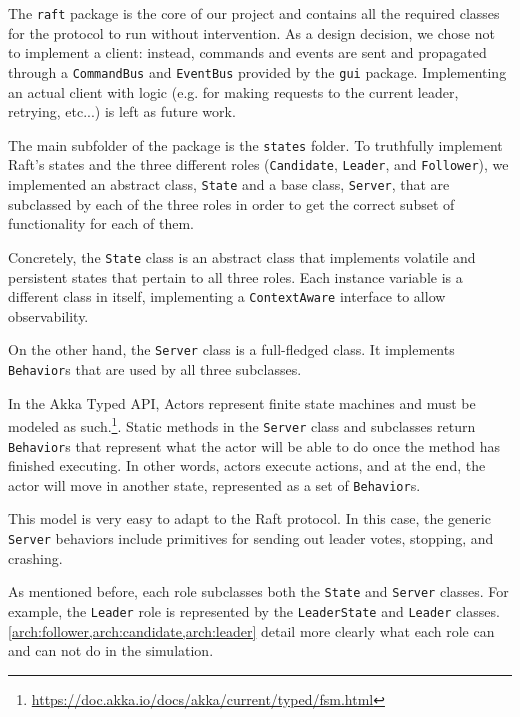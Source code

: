 The \texttt{raft} package is the core of our project and contains all the required classes for the protocol to run without intervention. As a design decision, we chose not to implement a client: instead, commands and events are sent and propagated through a \texttt{CommandBus} and \texttt{EventBus} provided by the \texttt{gui} package. Implementing an actual client with logic (e.g. for making requests to the current leader, retrying, etc...) is left as future work.

The main subfolder of the package is the \texttt{states} folder. To truthfully implement Raft's states and the three different roles (\texttt{Candidate}, \texttt{Leader}, and \texttt{Follower}), we implemented an abstract class, \texttt{State} and a base class, \texttt{Server}, that are subclassed by each of the three roles in order to get the correct subset of functionality for each of them.


Concretely, the \texttt{State} class is an abstract class that implements volatile and persistent states that pertain to all three roles. Each instance variable is a different class in itself, implementing a \texttt{ContextAware} interface to allow observability.

On the other hand, the \texttt{Server} class is a full-fledged class. It implements \texttt{Behavior}s that are used by all three subclasses.


In the Akka Typed API, Actors represent finite state machines and must be modeled as such.\footnote{\url{https://doc.akka.io/docs/akka/current/typed/fsm.html}}. Static methods in the \texttt{Server} class and subclasses return \texttt{Behavior}s that represent what the actor will be able to do once the method has finished executing. In other words, actors execute actions, and at the end, the actor will move in another state, represented as a set of \texttt{Behavior}s. 

This model is very easy to adapt to the Raft protocol. In this case, the generic \texttt{Server} behaviors include primitives for sending out leader votes, stopping, and crashing.

As mentioned before, each role subclasses both the \texttt{State} and \texttt{Server} classes. For example, the \texttt{Leader} role is represented by the \texttt{LeaderState} and \texttt{Leader} classes. \cref{arch:follower,arch:candidate,arch:leader} detail more clearly what each role can and can not do in the simulation.

